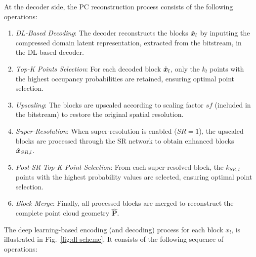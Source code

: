 At the decoder side, the PC reconstruction process consists of the following operations:
\begin{enumerate}[label=D\arabic*.]
    \item \textit{DL-Based Decoding}: The decoder reconstructs the blocks $\hat{\x}_l$ by inputting the compressed domain latent representation, extracted from the bitstream, in the DL-based decoder.
    \item \textit{Top-K Points Selection}: For each decoded block $\hat{\x}_l$, only the $k_l$ points with the highest occupancy probabilities are retained, ensuring optimal point selection.
    \item \textit{Upscaling}: The blocks are upscaled according to scaling factor $sf$ (included in the bitstream) to restore the original spatial resolution.
    \item \textit{Super-Resolution}: When super-resolution is enabled ($SR=1$), the upscaled blocks are processed through the SR network to obtain enhanced blocks $\hat{\x}_{SR, l}$.
    \item \textit{Post-SR Top-K Point Selection}: From each super-resolved block, the $k_{SR,l}$ points with the highest probability values are selected, ensuring optimal point selection.
    \item \textit{Block Merge}: Finally, all processed blocks are merged to reconstruct the complete point cloud geometry $\hat{\boldsymbol{P}}$.
\end{enumerate}

The deep learning-based encoding (and decoding) process for each block $x_l$, is illustrated in Fig.~\ref{fig:dl-scheme}. It consists of the following sequence of operations:

